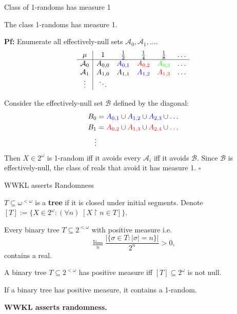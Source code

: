 \begin{frame}{Class of 1-randoms has measure 1}
  \begin{fact*}
    The class 1-randoms has measure 1.
  \end{fact*}

  \textbf{Pf:} Enumerate all effectively-null sets
  $\mathcal{A}_0,\mathcal{A}_1,\ldots$.
  \[\begin{array}{c|ccccc}
    \mu &1 &\frac{1}{2} &\frac{1}{4} &\frac{1}{8} &\ldots\\
    \hline
    \mathcal{A}_0 &A_{0,0} &\textcolor{blue}{A_{0,1}}
    &\textcolor{red}{A_{0,2}} &\textcolor{green}{A_{0,3}} &\ldots\\
    \mathcal{A}_1 &A_{1,0} &A_{1,1} &\textcolor{blue}{A_{1,2}}
    &\textcolor{red}{A_{1,3}} &\ldots\\
    \vdots &\ddots &&&&
  \end{array}\]

  Consider the effectively-null set $\mathcal{B}$ defined by the diagonal:
  \begin{align*}
    B_0&= \textcolor{blue}{A_{0,1}} \cup \textcolor{blue}{A_{1,2}} \cup
    \textcolor{blue}{A_{2,3}} \cup \textcolor{blue}{\ldots}\\
    B_1&= \textcolor{red}{A_{0,2}} \cup \textcolor{red}{A_{1,3}} \cup
    \textcolor{red}{A_{2,4}} \cup \textcolor{red}{\ldots}\\
    \vdots&
  \end{align*}
  Then $X\in2^\omega$ is 1-random iff it avoids every $\mathcal{A}_i$ iff
  it avoids $\mathcal{B}$. Since $\mathcal{B}$ is effectively-null, the
  class of reals that avoid it has measure 1. $\square$
\end{frame}

\begin{frame}{WWKL asserts Randomness}
  \begin{notation*}
    $T\subseteq\omega^{<\omega}$ is a \textbf{tree} if it is closed under
    initial segments. Denote $[T]:= \{X\in2^\omega: (\forall n)\;
    [X\restriction n \in T]\}$.
  \end{notation*}

  \begin{thm*}
    Every binary tree $T\subseteq 2^{<\omega}$ with positive measure i.e.
    \[\lim_n \frac{|\{\sigma\in T: |\sigma|=n\}|}{2^n} >0,\]
    contains a real.
  \end{thm*}
  \begin{fact}
    A binary tree $T\subseteq2^{<\omega}$ has positive measure iff
    $[T]\subseteq2^\omega$ is not null.
  \end{fact}
  \begin{coro}
    If a binary tree has positive measure, it contains a 1-random.
  \end{coro}

  \textbf{WWKL asserts randomness.}
\end{frame}

